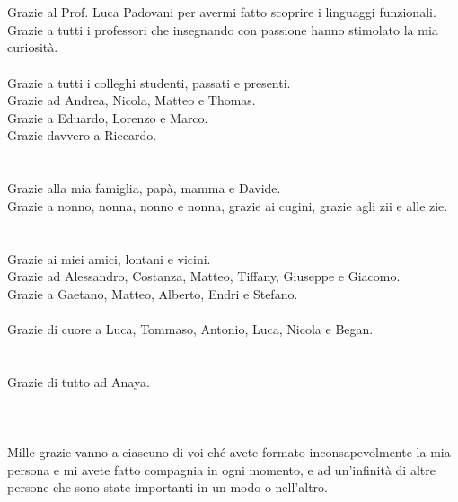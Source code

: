 \chapter*{}
\label{chap:8-thanks}

Grazie al Prof. Luca Padovani per avermi fatto scoprire i linguaggi funzionali. \\
Grazie a tutti i professori che insegnando con passione hanno stimolato la mia curiosità. \\
\\
Grazie a tutti i colleghi studenti, passati e presenti. \\
Grazie ad Andrea, Nicola, Matteo e Thomas. \\
Grazie a Eduardo, Lorenzo e Marco. \\
Grazie davvero a Riccardo. \\
\\
\\
Grazie alla mia famiglia, papà, mamma e Davide. \\
Grazie a nonno, nonna, nonno e nonna, grazie ai cugini, grazie agli zii e alle zie. \\
\\
\\
Grazie ai miei amici, lontani e vicini. \\
Grazie ad Alessandro, Costanza, Matteo, Tiffany, Giuseppe e Giacomo. \\
Grazie a Gaetano, Matteo, Alberto, Endri e Stefano. \\
\\
Grazie di cuore a Luca, Tommaso, Antonio, Luca, Nicola e Began. \\
\\
\\
Grazie di tutto ad Anaya.
\\
\\
\\
\\
Mille grazie vanno a ciascuno di voi ché avete formato inconsapevolmente la mia persona e mi avete fatto compagnia in ogni momento,
e ad un'infinità di altre persone che sono state importanti in un modo o nell'altro.